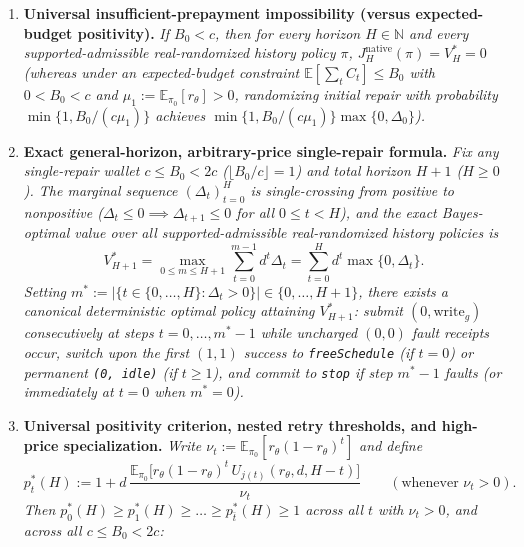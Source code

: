 \documentclass[11pt,letterpaper]{article}
\providecommand{\tightlist}{\setlength{\itemsep}{2pt}\setlength{\parskip}{0pt}}
\begin{document}
\begin{enumerate}
\def\labelenumi{\arabic{enumi}.}
\tightlist
\item
  \textbf{Universal insufficient-prepayment impossibility (versus
  expected-budget positivity).} \emph{If \(B_0 < c\), then for every
  horizon \(H \in \mathbb{N}\) and every supported-admissible
  real-randomized history policy \(\pi\),
  \(J_H^{\mathrm{native}}(\pi) = V_H^* = 0\) (whereas under an
  expected-budget constraint \(\mathbb{E}[\sum_t C_t] \le B_0\) with
  \(0 < B_0 < c\) and \(\mu_1 := \mathbb{E}_{\pi_0}[r_\theta] > 0\),
  randomizing initial repair with probability
  \(\min\{1, B_0/(c\mu_1)\}\) achieves
  \(\min\{1, B_0/(c\mu_1)\}\max\{0, \Delta_0\}\)).}
\item
  \textbf{Exact general-horizon, arbitrary-price single-repair formula.}
  \emph{Fix any single-repair wallet \(c \le B_0 < 2c\)
  (\(\lfloor B_0/c\rfloor = 1\)) and total horizon \(H + 1\)
  (\(H \ge 0\)). The marginal sequence \((\Delta_t)_{t=0}^H\) is
  single-crossing from positive to nonpositive
  (\(\Delta_t \le 0 \implies \Delta_{t+1} \le 0\) for all
  \(0 \le t < H\)), and the exact Bayes-optimal value over all
  supported-admissible real-randomized history policies is}
  \[V_{H+1}^* = \max_{0 \le m \le H+1} \sum_{t=0}^{m-1} d^t \Delta_t = \sum_{t=0}^{H} d^t \max\{0, \Delta_t\}.\]
  \emph{Setting
  \(m^* := |\{t \in \{0, \dots, H\} : \Delta_t > 0\}| \in \{0, \dots, H+1\}\),
  there exists a canonical deterministic optimal policy attaining
  \(V_{H+1}^*\): submit \((0, \mathrm{write}_g)\) consecutively at steps
  \(t = 0, \dots, m^* - 1\) while uncharged \((0,0)\) fault receipts
  occur, switch upon the first \((1,1)\) success to
  \texttt{freeSchedule} (if \(t = 0\)) or permanent \texttt{(0,\ idle)}
  (if \(t \ge 1\)), and commit to \texttt{stop} if step \(m^* - 1\)
  faults (or immediately at \(t = 0\) when \(m^* = 0\)).}
\item
  \textbf{Universal positivity criterion, nested retry thresholds, and
  high-price specialization.} \emph{Write
  \(\nu_t := \mathbb{E}_{\pi_0}[r_\theta(1 - r_\theta)^t]\) and define}
  \[p_t^*(H) := 1 + d\,\frac{\mathbb{E}_{\pi_0}\!\bigl[r_\theta (1 - r_\theta)^t\, U_{j(t)}(r_\theta, d, H - t)\bigr]}{\nu_t} \qquad (\text{whenever } \nu_t > 0).\]
  \emph{Then
  \(p_0^*(H) \ge p_1^*(H) \ge \dots \ge p_{\bar{t}}^*(H) \ge 1\) across
  all \(t\) with \(\nu_t > 0\), and across all \(c \le B_0 < 2c\):}


\end{enumerate}
\end{document}
